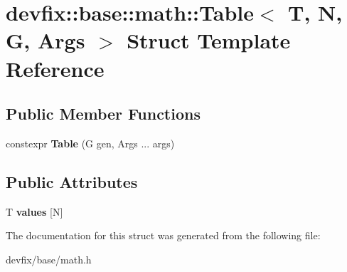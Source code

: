 \hypertarget{structdevfix_1_1base_1_1math_1_1Table}{}\section{devfix\+:\+:base\+:\+:math\+:\+:Table$<$ T, N, G, Args $>$ Struct Template Reference}
\label{structdevfix_1_1base_1_1math_1_1Table}
\subsection*{Public Member Functions}
\begin{DoxyCompactItemize}
\item 
\mbox{\label{structdevfix_1_1base_1_1math_1_1Table_aa9adcdb1a5d8c858690100fa20e06a2b}} 
constexpr {\bfseries Table} (G gen, Args ... args)
\end{DoxyCompactItemize}
\subsection*{Public Attributes}
\begin{DoxyCompactItemize}
\item 
\mbox{\label{structdevfix_1_1base_1_1math_1_1Table_a62c83a19d69fec924a3db9bc5bcc4777}} 
T {\bfseries values} \mbox{[}N\mbox{]}
\end{DoxyCompactItemize}


The documentation for this struct was generated from the following file\+:\begin{DoxyCompactItemize}
\item 
devfix/base/math.\+h\end{DoxyCompactItemize}
